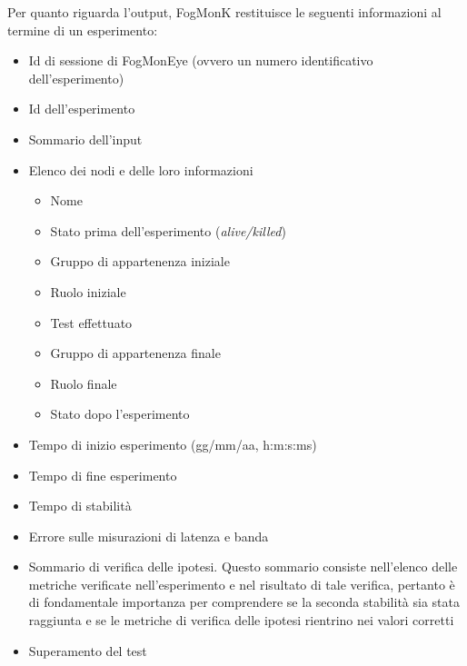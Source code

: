         Per quanto riguarda l'output, FogMonK restituisce le seguenti informazioni al termine di un esperimento: 
        \begin{itemize}
            \item Id di sessione di FogMonEye (ovvero un numero identificativo dell'esperimento)
            
            \item Id dell’esperimento 
            
            \item Sommario dell’input 
            
            \item Elenco dei nodi e delle loro informazioni 
                \begin{itemize}
                \item Nome 
                
                \item Stato prima dell’esperimento (\textit{alive/killed}) 
                
                \item Gruppo di appartenenza iniziale 
                
                \item Ruolo iniziale 
                
                \item Test effettuato 
                
                \item Gruppo di appartenenza finale 
                
                \item Ruolo finale 
                
                \item Stato dopo l’esperimento 
                \end {itemize}
            
            \item Tempo di inizio esperimento (gg/mm/aa, h:m:s:ms) 
            
            \item Tempo di fine esperimento 
            
            \item Tempo di stabilità 
            
            \item Errore sulle misurazioni di latenza e banda 
            
            \item Sommario di verifica delle ipotesi. Questo sommario consiste nell'elenco delle metriche verificate nell'esperimento e nel risultato di tale verifica, pertanto è di fondamentale importanza per comprendere se la seconda stabilità sia stata raggiunta e se le metriche di verifica delle ipotesi rientrino nei valori corretti
            
            \item Superamento del test 
        \end{itemize}
